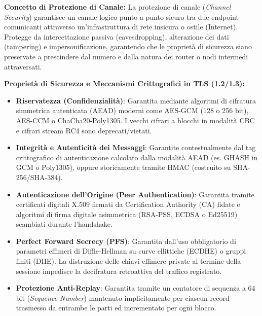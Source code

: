 \documentclass[11pt,a4paper]{article}
\begin{document}
\begin{solutionbox}
\textbf{Concetto di Protezione di Canale:}
La protezione di canale (\textit{Channel Security}) garantisce un canale logico punto-a-punto sicuro tra due endpoint comunicanti attraverso un'infrastruttura di rete insicura o ostile (Internet). Protegge da intercettazione passiva (eavesdropping), alterazione dei dati (tampering) e impersonificazione, garantendo che le propriet\`a di sicurezza siano preservate a prescindere dal numero e dalla natura dei router o nodi intermedi attraversati.

\textbf{Propriet\`a di Sicurezza e Meccanismi Crittografici in TLS (1.2/1.3):}
\begin{itemize}
    \item \textbf{Riservatezza (Confidenzialit\`a)}: Garantita mediante algoritmi di cifratura simmetrica autenticata (AEAD) moderni come AES-GCM (128 o 256 bit), AES-CCM o ChaCha20-Poly1305. I vecchi cifrari a blocchi in modalit\`a CBC e cifrari stream RC4 sono deprecati/vietati.
    \item \textbf{Integrit\`a e Autenticit\`a dei Messaggi}: Garantite contestualmente dal tag crittografico di autenticazione calcolato dalla modalit\`a AEAD (es. GHASH in GCM o Poly1305), oppure storicamente tramite HMAC (costruito su SHA-256/SHA-384).
    \item \textbf{Autenticazione dell'Origine (Peer Authentication)}: Garantita tramite certificati digitali X.509 firmati da Certification Authority (CA) fidate e algoritmi di firma digitale asimmetrica (RSA-PSS, ECDSA o Ed25519) scambiati durante l'handshake.
    \item \textbf{Perfect Forward Secrecy (PFS)}: Garantita dall'uso obbligatorio di parametri effimeri di Diffie-Hellman su curve ellittiche (ECDHE) o gruppi finiti (DHE). La distruzione delle chiavi effimere private al termine della sessione impedisce la decifratura retroattiva del traffico registrato.
    \item \textbf{Protezione Anti-Replay}: Garantita tramite un contatore di sequenza a 64 bit (\textit{Sequence Number}) mantenuto implicitamente per ciascun record trasmesso da entrambe le parti ed incrementato per ogni blocco.
\end{itemize}


\end{solutionbox}
\end{document}
